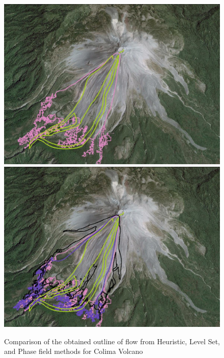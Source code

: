 \documentclass[letterpaper,10pt]{article}
\begin{document}
\begin{figure}[H]
\begin{minipage}[b]{.5\linewidth}
\end{minipage}
\begin{minipage}[b]{.5 \linewidth}
                \centering
                \includegraphics[width=.95\textwidth]{IMAGES/phasefield1.jpg}
                \includegraphics[width=.95\textwidth]{IMAGES/comparison1.jpg}
        \end{minipage}
        \caption{Comparison of the obtained outline of flow from Heuristic, Level Set, and Phase field methods for Colima Volcano}
        \label{Colimapic}
\end{figure}
\end{document}
